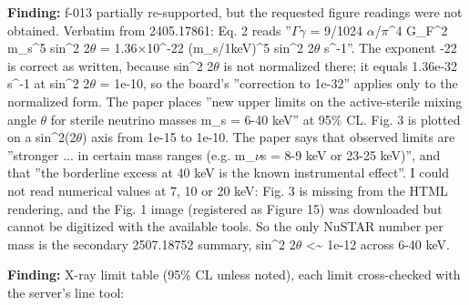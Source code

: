 \documentclass[11pt,a4paper]{article}
\begin{document}
\textbf{Finding:} f-013 partially re-supported, but the requested figure readings were not obtained. Verbatim from 2405.17861: Eq. 2 reads ''$\Gamma$$\gamma$ = 9/1024 $\alpha$/$\pi$\textasciicircum{}4 G\_F\textasciicircum{}2 m\_s\textasciicircum{}5 sin\textasciicircum{}2 2$\theta$ = 1.36$\times$10\textasciicircum{}-22 (m\_s/1keV)\textasciicircum{}5 sin\textasciicircum{}2 2$\theta$ s\textasciicircum{}-1''. The exponent -22 is correct as written, because sin\textasciicircum{}2 2$\theta$ is not normalized there; it equals 1.36e-32 s\textasciicircum{}-1 at sin\textasciicircum{}2 2$\theta$ = 1e-10, so the board's ''correction to 1e-32'' applies only to the normalized form. The paper places ''new upper limits on the active-sterile mixing angle $\theta$ for sterile neutrino masses m\_s = 6-40 keV'' at 95\% CL. Fig. 3 is plotted on a sin\textasciicircum{}2(2$\theta$) axis from 1e-15 to 1e-10. The paper says that observed limits are ''stronger ... in certain mass ranges (e.g. m\_$\nu$s = 8-9 keV or 23-25 keV)'', and that ''the borderline excess at 40 keV is the known instrumental effect''. I could not read numerical values at 7, 10 or 20 keV: Fig. 3 is missing from the HTML rendering, and the Fig. 1 image (registered as Figure 15) was downloaded but cannot be digitized with the available tools. So the only NuSTAR number per mass is the secondary 2507.18752 summary, sin\textasciicircum{}2 2$\theta$ \textless{}\textasciitilde{} 1e-12 across 6-40 keV.

\textbf{Finding:} X-ray limit table (95\% CL unless noted), each limit cross-checked with the server's line tool:
\end{document}
